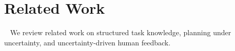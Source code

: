 \section{Related Work}~\label{related}
We review related work on structured task knowledge, planning under uncertainty, and uncertainty-driven human feedback.

